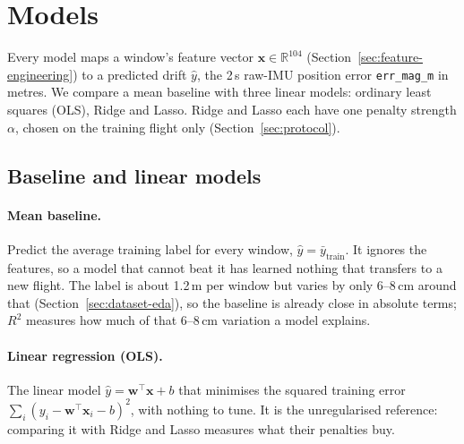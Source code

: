 %

\section{Models}
\label{sec:models}

Every model maps a window's feature vector $\mathbf{x} \in \mathbb{R}^{104}$
(Section~\ref{sec:feature-engineering}) to a predicted drift $\hat{y}$, the
2\,s raw-IMU position error \texttt{err\_mag\_m} in metres. We compare a mean
baseline with three linear models: ordinary least squares (OLS), Ridge and
Lasso. Ridge and Lasso each have one penalty strength $\alpha$, chosen on the
training flight only (Section~\ref{sec:protocol}).

\subsection{Baseline and linear models}

\paragraph{Mean baseline.}
Predict the average training label for every window,
$\hat{y} = \bar{y}_{\text{train}}$. It ignores the features, so a model that
cannot beat it has learned nothing that transfers to a new flight. The label is
about 1.2\,m per window but varies by only 6--8\,cm around that
(Section~\ref{sec:dataset-eda}), so the baseline is already close in absolute
terms; $R^2$ measures how much of that 6--8\,cm variation a model explains.

\paragraph{Linear regression (OLS).}
The linear model $\hat{y} = \mathbf{w}^\top \mathbf{x} + b$ that minimises the
squared training error $\sum_{i} (y_i - \mathbf{w}^\top \mathbf{x}_i - b)^2$,
with nothing to tune. It is the unregularised reference: comparing it with
Ridge and Lasso measures what their penalties buy.

